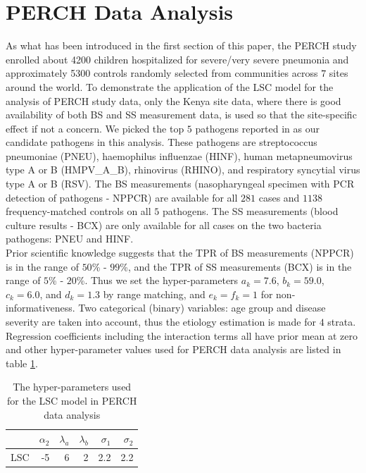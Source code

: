 \documentclass[11 pt, a4paper]{article}  %
\begin{document}
\section{PERCH Data Analysis}
As what has been introduced in the first section of this paper, the PERCH study enrolled about 4200 children hospitalized for severe/very severe pneumonia and approximately 5300 controls randomly selected from communities across $7$ sites around the world. To demonstrate the application of the LSC model for the analysis of PERCH study data, only the Kenya site data, where there is good availability of both BS and SS measurement data, is used so that the site-specific effect if not a concern. We picked the top $5$ pathogens reported in \cite{wu2015partially} as our candidate pathogens in this analysis. These pathogens are streptococcus pneumoniae (PNEU), haemophilus influenzae (HINF), human metapneumovirus type A or B (HMPV\_A\_B), rhinovirus (RHINO), and respiratory syncytial virus type A or B (RSV). The BS measurements (nasopharyngeal specimen with PCR detection of pathogens - NPPCR) are available for all $281$ cases and $1138$ frequency-matched controls on all $5$ pathogens. The SS measurements (blood culture results - BCX) are only available for all cases on the two bacteria pathogens: PNEU and HINF. \\

Prior scientific knowledge \cite{murdoch2012laboratory} suggests that the TPR of BS measurements (NPPCR) is in the range of $50$\% - $99$\%, and the TPR of SS measurements (BCX) is in the range of $5$\% - $20$\%. Thus we set the hyper-parameters $a_k = 7.6$, $b_k = 59.0$, $c_k = 6.0$, and $d_k = 1.3$ by range matching, and $e_k = f_k = 1$ for non-informativeness. Two categorical (binary) variables: age group and disease severity are taken into account, thus the etiology estimation is made for $4$ strata. Regression coefficients including the interaction terms all have prior mean at zero and other hyper-parameter values used for PERCH data analysis are listed in table \ref{tab:perchhyper}. \\


\begin{table}[h]
\centering
\caption{The hyper-parameters used for the LSC model in PERCH data analysis}
\label{tab:perchhyper}
\begin{tabular}{lrrrrr}
\hline
        & $\alpha_2$ & $\lambda_a$ & $\lambda_b$ & $\sigma_1$  & $\sigma_2$    \\ \hline
LSC     & -5 & 6  & 2 & 2.2 & 2.2 \\ \hline
\end{tabular}
\end{table}
\end{document}
